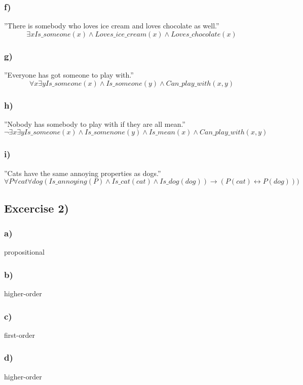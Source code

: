 \documentclass[12pt]{article}
\begin{document}
\subsubsection*{f)}
”There is somebody who loves ice cream and loves chocolate as well.”
\begin{equation}
  \exists x Is\_someone(x) \land Loves\_ice\_cream(x) \land Loves\_chocolate(x)
\end{equation}
\subsubsection*{g)}
”Everyone has got someone to play with.”
\begin{equation}
  \forall x \exists y Is\_someone(x) \land Is\_someone(y) \land Can\_play\_with(x, y)
\end{equation}
\subsubsection*{h)}
”Nobody has somebody to play with if they are all mean.”
\begin{equation}
  \neg \exists x \exists y Is\_someone(x) \land Is\_somenone(y) \land Is\_mean(x) \land Can\_play\_with(x, y)
\end{equation}
\subsubsection*{i)}
”Cats have the same annoying properties as dogs.”
\begin{equation}
  \forall P \forall cat \forall dog (Is\_annoying(P) \land Is\_cat(cat) \land Is\_dog(dog)) \rightarrow  (P(cat) \leftrightarrow P(dog)))
\end{equation}
\subsection*{Excercise 2)}
\subsubsection*{a)}
propositional
\subsubsection*{b)}
higher-order
\subsubsection*{c)}
first-order
\subsubsection*{d)}
higher-order
\end{document}
